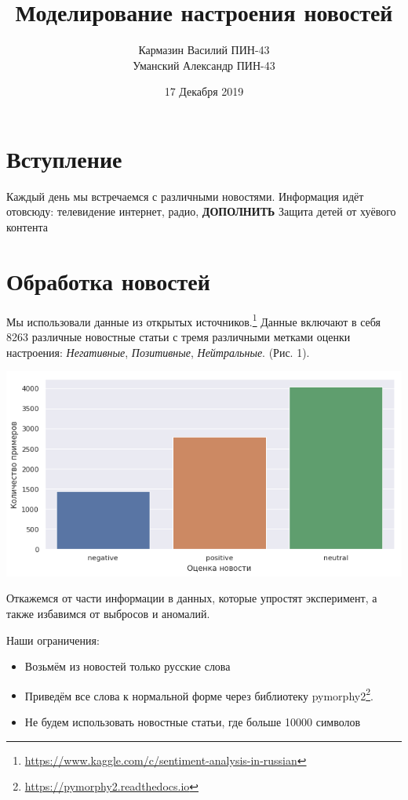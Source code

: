\documentclass[12pt]{article}
\title{\textbf{Моделирование настроения новостей}}
\date{17 Декабря 2019}
\author{Кармазин Василий ПИН-43\\ Уманский Александр ПИН-43}
\begin{document}
    \maketitle

    \section{Вступление}
        Каждый день мы встречаемся с различными новостями. Информация идёт отовсюду: телевидение
        интернет, радио, \textbf{ДОПОЛНИТЬ} Защита детей от хуёвого контента

    \section{Обработка новостей}
        Мы использовали данные из открытых источников.\footnote{\href{https://www.kaggle.com/c/sentiment-analysis-in-russian}{https://www.kaggle.com/c/sentiment-analysis-in-russian}}
        Данные включают в себя 8263 различные новостные статьи с тремя различными метками оценки настроения: 
        \textit{Негативные}, \textit{Позитивные}, \textit{Нейтральные}. (Рис. 1).

        \begin{center}
            \includegraphics[scale=0.5]{sent_dist}
        \end{center}

        
        Откажемся от части информации в данных, которые упростят эксперимент, а также избавимся 
        от выбросов и аномалий. 
        
        Наши ограничения:
        \begin{itemize}
            \item Возьмём из новостей только русские слова
            \item Приведём все слова к нормальной форме через библиотеку pymorphy2\footnote{\href{https://pymorphy2.readthedocs.io}{https://pymorphy2.readthedocs.io}}.
            \item Не будем использовать новостные статьи, где больше 10000 символов
        \end{itemize}
\end{document}
